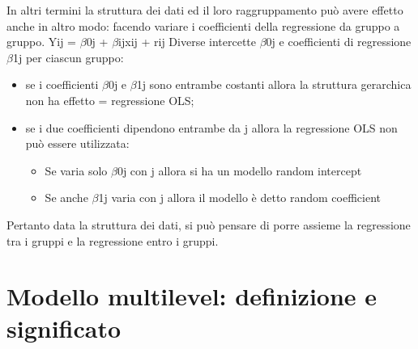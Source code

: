 \documentclass[a4page, 11pt]{article}
\begin{document}
In altri termini la struttura dei dati ed il loro raggruppamento può avere effetto anche in altro modo: facendo variare i coefficienti della regressione da gruppo a gruppo.
\newline
\newline
Yij = $\beta$0j + $\beta$ijxij + rij
\newline
\newline
Diverse intercette $\beta$0j e coefficienti di regressione $\beta$1j per ciascun gruppo:
\begin{itemize}	
\item se i coefficienti $\beta$0j e $\beta$1j sono entrambe costanti allora la struttura
gerarchica non ha effetto = regressione OLS;
\item se i due coefficienti dipendono entrambe da j allora la regressione OLS
non può essere utilizzata:
	\begin{itemize}
	\item Se varia solo $\beta$0j con j allora si ha un modello random intercept
 	\item Se anche $\beta$1j varia con j allora il modello è detto random coefficient
	\end{itemize}
\end{itemize}
Pertanto data la struttura dei dati, si può pensare di porre assieme la regressione tra i gruppi e la regressione entro i gruppi.


\section{Modello multilevel: definizione e significato}
\end{document}
